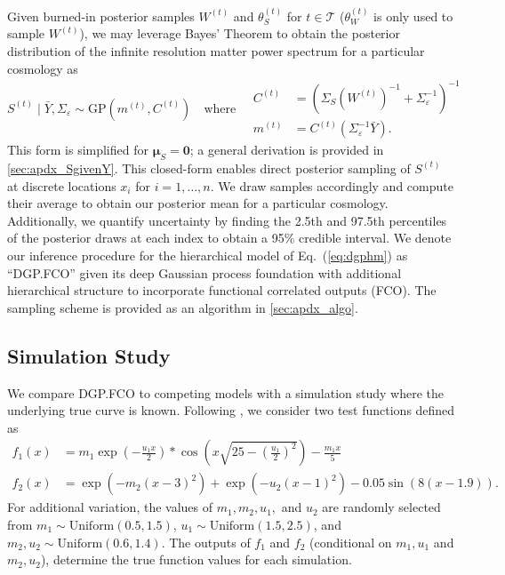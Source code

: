 \documentclass[11pt]{article}
\begin{document}
Given burned-in posterior samples $W^{(t)}$ and $\theta_S^{(t)}$
for $t\in\mathcal{T}$ ($\theta_W^{(t)}$ is only used to sample $W^{(t)}$), 
we may leverage Bayes' Theorem to obtain the
posterior distribution of the infinite resolution matter power spectrum for a particular cosmology as
\[
S^{(t)}\mid\bar{Y}, \Sigma_\varepsilon \sim \mathrm{GP}(m^{(t)}, C^{(t)})
\quad\textrm{where}\quad
\begin{array}{rl}
C^{(t)}&=\left(\Sigma_S(W^{(t)})^{-1}+\Sigma_\varepsilon^{-1}\right)^{-1} \\
m^{(t)}&=C^{(t)}\left(\Sigma_\varepsilon^{-1}\bar{Y}\right).
\end{array}
\] 
This form is simplified for $\boldsymbol{\mu}_S=\mathbf{0}$; a general derivation 
is provided in \ref{sec:apdx_SgivenY}.  This closed-form enables direct posterior
sampling of $S^{(t)}$ at discrete locations $x_i$ for $i=1,\dots, n$.  
We draw samples accordingly and compute their average 
to obtain our posterior mean for a particular cosmology. 
Additionally, we quantify uncertainty by finding the 2.5th and 97.5th percentiles 
of the posterior draws at each index to obtain a 95\% credible interval.
We denote our inference procedure for the hierarchical model of Eq.~(\ref{eq:dgphm}) as
``DGP.FCO'' given its deep Gaussian process foundation with additional hierarchical
structure to incorporate functional correlated outputs (FCO). 
The sampling scheme is provided as an algorithm in \ref{sec:apdx_algo}.

\subsection{Simulation Study}
\label{subsec:sim}

We compare DGP.FCO to competing models with a simulation study where the underlying 
true curve is known. Following \cite{moran2024dpc}, we consider two test functions 
defined as
\[
\begin{aligned}
  f_1(x) &= m_1 \exp\left(-\frac{u_1x}{2}\right) * 
  \cos\left(x\sqrt{25-\left(\frac{u_1}{2}\right)^2}\right) - \frac{m_1x}{5}\\
  f_2(x) &= \exp\left(-m_2(x-3)^2\right) + 
  \exp\left(-u_2(x-1)^2\right)-0.05\sin\left(8(x-1.9)\right).
\end{aligned}
\]
For additional variation, the values of $m_1, m_2, u_1,$ and $u_2$ are randomly selected from
$m_1 \sim \text{Uniform}(0.5,1.5)$, $u_1 \sim \text{Uniform}(1.5,2.5)$, and $m_2,u_2 
\sim \text{Uniform}(0.6,1.4)$. The outputs of $f_1$ and $f_2$ (conditional on $m_1,u_1$ and 
$m_2,u_2$), determine the true function values for each simulation.
      
\end{document}
